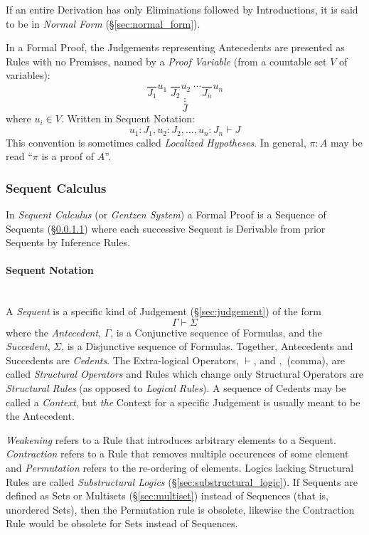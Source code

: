 If an entire Derivation has only Eliminations followed by
Introductions, it is said to be in \emph{Normal Form}
(\S\ref{sec:normal_form}).

In a Formal Proof, the Judgements representing Antecedents are
presented as Rules with no Premises, named by a \emph{Proof Variable}
(from a countable set $V$ of variables):
\[
    \frac{}{J_1}u_1 \; \frac{}{J_2}u_2 \; \cdots \frac{}{J_n}u_n
\]\[
    \vdots
\]\[
    J
\]
where $u_i \in V$. Written in Sequent Notation:
\[
    u_1:J_1, u_2:J_2, \ldots, u_n:J_n \vdash J
\]
This convention is sometimes called \emph{Localized Hypotheses}. In
general, $\pi : A$ may be read ``$\pi$ is a proof of $A$''.



\subsubsection{Sequent Calculus}\label{sec:sequent_calculus}

In \emph{Sequent Calculus} (or \emph{Gentzen System}) a Formal Proof
is a Sequence of Sequents (\S\ref{sec:sequent_notation}) where each
successive Sequent is Derivable from prior Sequents by Inference
Rules.



\paragraph{Sequent Notation}\label{sec:sequent_notation} \hfill \\

A \emph{Sequent} is a specific kind of Judgement
(\S\ref{sec:judgement}) of the form
\[
    \Gamma \vdash \Sigma
\]
where the \emph{Antecedent}, $\Gamma$, is a Conjunctive sequence of
Formulas, and the \emph{Succedent}, $\Sigma$, is a Disjunctive
sequence of Formulas. Together, Antecedents and Succedents are
\emph{Cedents}. The Extra-logical Operators, $\vdash$, and $,$
(comma), are called \emph{Structural Operators} and Rules which change
only Structural Operators are \emph{Structural Rules} (as opposed to
\emph{Logical Rules}). A sequence of Cedents may be called a
\emph{Context}, but \emph{the} Context for a specific Judgement is
usually meant to be the Antecedent.

\emph{Weakening} refers to a Rule that introduces arbitrary elements
to a Sequent. \emph{Contraction} refers to a Rule that removes
multiple occurences of some element and \emph{Permutation} refers to
the re-ordering of elements. Logics lacking Structural Rules are
called \emph{Substructural Logics} (\S\ref{sec:substructural_logic}).
If Sequents are defined as Sets or Multisets (\S\ref{sec:multiset})
instead of Sequences (that is, unordered Sets), then the Permutation
rule is obsolete, likewise the Contraction Rule would be obsolete for
Sets instead of Sequences.

